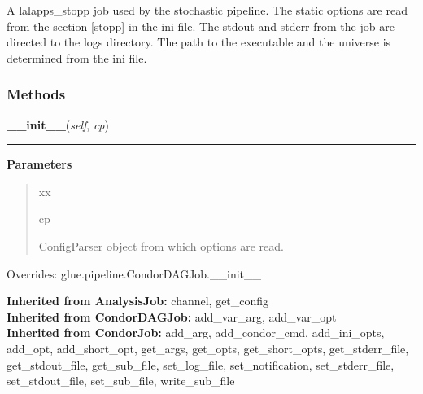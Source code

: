 A lalapps\_stopp job used by the stochastic pipeline. The static options 
are read from the section [stopp] in the ini file. The stdout and stderr 
from the job are directed to the logs directory. The path to the 
executable and the universe is determined from the ini file.



  \subsubsection{Methods}

    \label{stochastic:StoppJob:__init__}
    \vspace{0.5ex}

    \begin{boxedminipage}{\textwidth}

    \raggedright \textbf{\_\_init\_\_}(\textit{self}, \textit{cp})

    \vspace{-1.5ex}

    \rule{\textwidth}{0.5\fboxrule}
    \vspace{1ex}

      \textbf{Parameters}
      \begin{quote}
        \begin{Ventry}{xx}

          \item[cp]

          ConfigParser object from which options are read.

        \end{Ventry}

      \end{quote}

    \vspace{1ex}

      Overrides: glue.pipeline.CondorDAGJob.\_\_init\_\_

    \end{boxedminipage}

  \textbf{Inherited from AnalysisJob:}
    channel,
    get\_config
    \\
  \textbf{Inherited from CondorDAGJob:}
    add\_var\_arg,
    add\_var\_opt
    \\
  \textbf{Inherited from CondorJob:}
    add\_arg,
    add\_condor\_cmd,
    add\_ini\_opts,
    add\_opt,
    add\_short\_opt,
    get\_args,
    get\_opts,
    get\_short\_opts,
    get\_stderr\_file,
    get\_stdout\_file,
    get\_sub\_file,
    set\_log\_file,
    set\_notification,
    set\_stderr\_file,
    set\_stdout\_file,
    set\_sub\_file,
    write\_sub\_file

